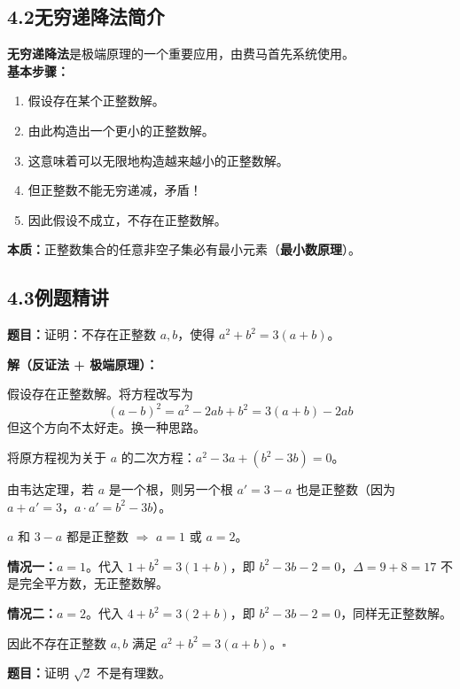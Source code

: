\documentclass[12pt, a4paper]{ctexart}
\begin{document}
\subsection*{4.2\quad 无穷递降法简介}

\begin{knowledgebox}[无穷递降法]
\textbf{无穷递降法}是极端原理的一个重要应用，由费马首先系统使用。\\[4pt]
\textbf{基本步骤：}
\begin{enumerate}[itemsep=2pt]
  \item 假设存在某个正整数解。
  \item 由此构造出一个更小的正整数解。
  \item 这意味着可以无限地构造越来越小的正整数解。
  \item 但正整数不能无穷递减，矛盾！
  \item 因此假设不成立，不存在正整数解。
\end{enumerate}
\textbf{本质：}正整数集合的任意非空子集必有最小元素（\textbf{最小数原理}）。
\end{knowledgebox}

\subsection*{4.3\quad 例题精讲}

\begin{examplebox}
\textbf{题目：}证明：不存在正整数 $a,b$，使得 $a^2+b^2=3(a+b)$。
\end{examplebox}

\textbf{解（反证法 + 极端原理）：}\;

假设存在正整数解。将方程改写为
\[(a-b)^2 = a^2-2ab+b^2 = 3(a+b)-2ab\]
但这个方向不太好走。换一种思路。

将原方程视为关于 $a$ 的二次方程：$a^2-3a+(b^2-3b)=0$。

由韦达定理，若 $a$ 是一个根，则另一个根 $a'=3-a$ 也是正整数（因为 $a+a'=3$，$a\cdot a'=b^2-3b$）。

$a$ 和 $3-a$ 都是正整数 $\Rightarrow$ $a=1$ 或 $a=2$。

\textbf{情况一：}$a=1$。代入 $1+b^2=3(1+b)$，即 $b^2-3b-2=0$，$\Delta=9+8=17$ 不是完全平方数，无正整数解。

\textbf{情况二：}$a=2$。代入 $4+b^2=3(2+b)$，即 $b^2-3b-2=0$，同样无正整数解。

因此不存在正整数 $a,b$ 满足 $a^2+b^2=3(a+b)$。\hfill$\square$

\begin{examplebox}[【例11】无穷递降法]
\textbf{题目：}证明 $\sqrt{2}$ 不是有理数。
\end{examplebox}
\end{document}
